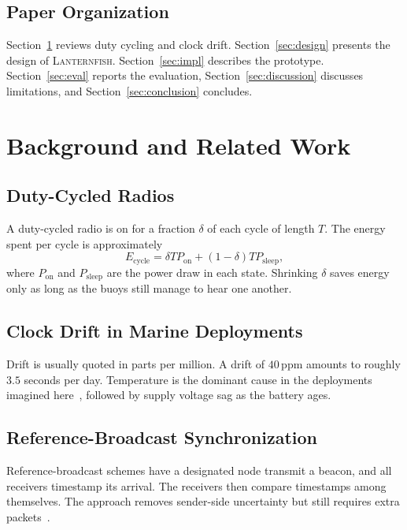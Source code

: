 \documentclass[conference]{IEEEtran}
\newcommand{\sysname}{\textsc{Lanternfish}}
\begin{document}
\subsection{Paper Organization}
\label{sec:intro-org}

Section~\ref{sec:background} reviews duty cycling and clock drift.
Section~\ref{sec:design} presents the design of \sysname.
Section~\ref{sec:impl} describes the prototype.
Section~\ref{sec:eval} reports the evaluation, Section~\ref{sec:discussion}
discusses limitations, and Section~\ref{sec:conclusion} concludes.

\section{Background and Related Work}
\label{sec:background}

\subsection{Duty-Cycled Radios}
\label{sec:bg-duty}

A duty-cycled radio is on for a fraction $\delta$ of each cycle of length $T$.
The energy spent per cycle is approximately
\begin{equation}
  E_{\mathrm{cycle}} = \delta T P_{\mathrm{on}} + (1 - \delta) T P_{\mathrm{sleep}},
  \label{eq:energy}
\end{equation}
where $P_{\mathrm{on}}$ and $P_{\mathrm{sleep}}$ are the power draw in each
state. Shrinking $\delta$ saves energy only as long as the buoys still manage
to hear one another.

\subsection{Clock Drift in Marine Deployments}
\label{sec:bg-drift}

Drift is usually quoted in parts per million. A drift of $40$\,ppm amounts to
roughly $3.5$ seconds per day. Temperature is the dominant cause in the
deployments imagined here~\cite{harcourt2029coldwater}, followed by supply
voltage sag as the battery ages.

\subsection{Reference-Broadcast Synchronization}
\label{sec:bg-rbs}

Reference-broadcast schemes have a designated node transmit a beacon, and all
receivers timestamp its arrival. The receivers then compare timestamps among
themselves. The approach removes sender-side uncertainty but still requires
extra packets~\cite{ruiz2030beacon,pemberton2028pairwise}.
\end{document}
